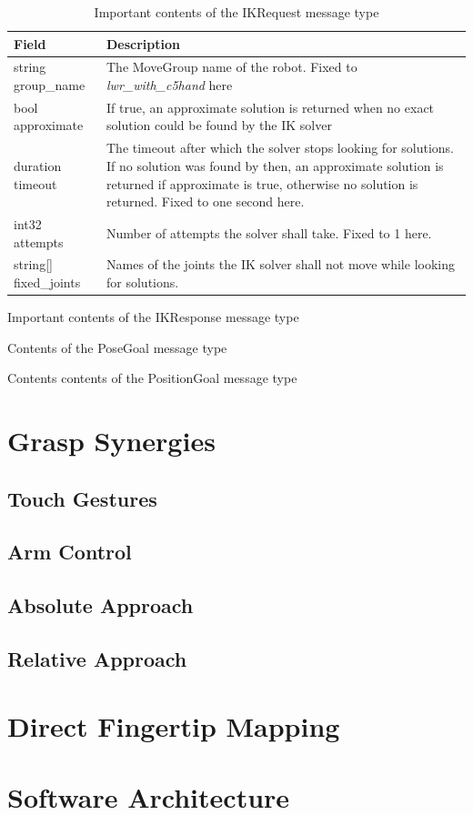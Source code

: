 \begin{table}
	\caption{Important contents of the IKRequest message type\label{tab:msg:ikrequest}}
	\begin{tabularx}{\linewidth}{|l|X|}
		\hline
		\textbf{Field} & \textbf{Description} \\
		\hline
		string group\_name & The MoveGroup name of the robot. Fixed to \textit{lwr\_with\_c5hand} here \\
		\hline
		bool approximate & If true, an approximate solution is returned when no exact solution could be found by the IK solver \\
		\hline
		duration timeout & The timeout after which the solver stops looking for solutions. If no solution was found by then, an approximate solution is returned if approximate is true, otherwise no solution is returned. Fixed to one second here. \\
		\hline
		int32 attempts & Number of attempts the solver shall take. Fixed to 1 here. \\
		\hline
		string[] fixed\_joints & Names of the joints the IK solver shall not move while looking for solutions. \\
		\hline
	\end{tabularx}
\end{table}

\begin{table}
	\caption{Important contents of the IKResponse message type\label{tab:msg:ikresponse}}
\end{table}

\begin{table}
	\caption{Contents of the PoseGoal message type\label{tab:msg:posegoal}}
\end{table}

\begin{table}
	\caption{Contents contents of the PositionGoal message type\label{tab:msg:positiongoal}}
\end{table}

\section{Grasp Synergies}

\subsection{Touch Gestures}

\subsection{Arm Control}

\subsection{Absolute Approach}
\label{sec:synergies:absolute}

\subsection{Relative Approach}

\section{Direct Fingertip Mapping}

\section{Software Architecture}